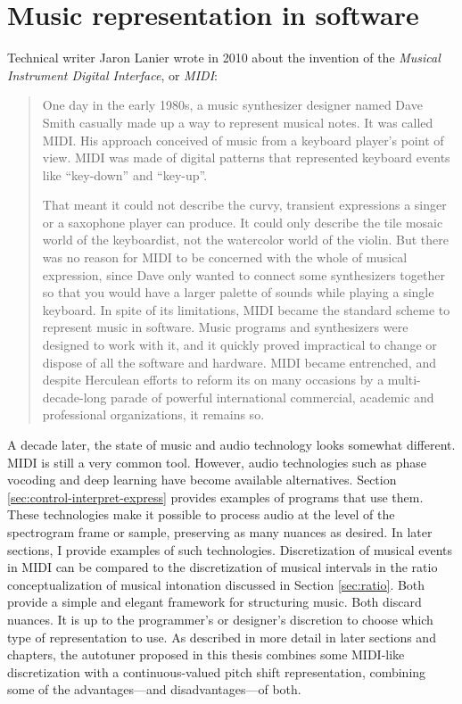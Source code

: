 \section{Music representation in software}
Technical writer Jaron Lanier wrote in 2010 about the invention of the \textit{Musical Instrument Digital Interface}, or \textit{MIDI}: \begin{quote}One day in the early 1980s, a music synthesizer designer named Dave Smith casually made up a way to represent musical notes. It was called MIDI. His approach conceived of music from a keyboard player's point of view. MIDI was made of digital patterns that represented keyboard events like ``key-down'' and ``key-up''. 

That meant it could not describe the curvy, transient expressions a singer or a saxophone player can produce. It could only describe the tile mosaic world of the keyboardist, not the watercolor world of the violin. But there was no reason for MIDI to be concerned with the whole of musical expression, since Dave only wanted to connect some synthesizers together so that you would have a larger palette of sounds while playing a single keyboard. In spite of its limitations, MIDI became the standard scheme to represent music in software. Music programs and synthesizers were designed to work with it, and it quickly proved impractical to change or dispose of all the software and hardware. MIDI became entrenched, and despite Herculean efforts to reform its on many occasions by a multi-decade-long parade of powerful international commercial, academic and professional organizations, it remains so. \cite[p.~7]{lanier2010you}\end{quote}

A decade later, the state of music and audio technology looks somewhat different. MIDI is still a very common tool. However, audio technologies such as phase vocoding and deep learning have become available alternatives. Section \ref{sec:control-interpret-express} provides examples of programs that use them. These technologies make it possible to process audio at the level of the spectrogram frame or sample, preserving as many nuances as desired. In later sections, I provide examples of such technologies. Discretization of musical events in MIDI can be compared to the discretization of musical intervals in the ratio conceptualization of musical intonation discussed in Section \ref{sec:ratio}. Both provide a simple and elegant framework for structuring music. Both discard nuances. It is up to the programmer's or designer's discretion to choose which type of representation to use. As described in more detail in later sections and chapters, the autotuner proposed in this thesis combines some MIDI-like discretization with a continuous-valued pitch shift representation, combining some of the advantages---and disadvantages---of both.

